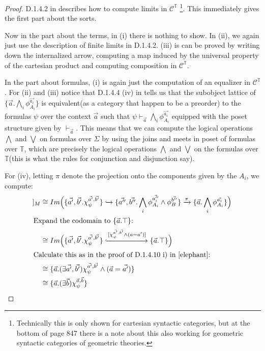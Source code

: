 \documentclass[a4paper]{amsproc}
\theoremstyle{plain}
\theoremstyle{definition}
\theoremstyle{remark}
\numberwithin{equation}{section}
\newcommand{\ldoub}{[\![ }
\newcommand{\rdoub}{]\!]}
\begin{document}
\begin{proof}
D.1.4.2 in \cite{elephant} describes how to compute limits in $\mathcal{C}^{\mathbb{T}}$ \footnote{Technically this is only shown for cartesian syntactic categories, but at the bottom of page 847 there is a note about this also working for geometric syntactic categories of geometric theories.}. This immediately gives the first part about the sorts.

Now in the part about the terms, in (i) there is nothing to show. In (ii), we again just use the description of finite limits in D.1.4.2. (iii) is can be proved by writing down the internalized arrow, computing a map induced by the universal property of the cartesian product and computing composition in $\mathcal{C}^{\mathbb{T}}$.

In the part about formulas, (i) is again just the computation of an equalizer in $\mathcal{C}^{\mathbb{T}}$. For (ii) and (iii) notice that D.1.4.4 (iv) in \cite{elephant} tells us that the subobject lattice of $\{ \vec{a} . \bigwedge_i \phi_{A_i}^{\vec{a_i}}\}$ is equivalent(as a category that happen to be a preorder) to the formulas $\psi$ over the context $\vec{a}$ such that $\psi \vdash_{\vec{a}} \bigwedge_i \phi_{A_i}^{\vec{a_i}}$ equipped with the poset structure given by $\vdash_{\vec{a}}$. This means that we can compute the logical operations $\bigwedge$ and $\bigvee$ on formulas over $\Sigma$ by using the joins and meets in poset of formulas over $\mathbb{T}$, which are precisely the logical operations $\bigwedge$ and $\bigvee$ on the formulas over $\mathbb{T}$(this is what the rules for conjunction and disjunction say).

For (iv), letting $\pi$ denote the projection onto the components given by the $A_i$, we compute:
\begin{align*}
\ldoub \vec{x} . (\exists y) \psi \rdoub_M
&\cong Im \Big (\{ \vec{a'}, \vec{b'} . \chi_{\psi}^{\vec{a'}, \vec{b'}}\} \xhookrightarrow{} \{\vec{a''}, \vec{b''} . \bigwedge_i \phi_{A_i}^{\vec{a_i''}} \wedge \phi_B^{\vec{b''}} \} \xrightarrow{\pi} \{\vec{a} . \bigwedge_i \phi_{A_i}^{\vec{a_i}}\} \Big ) \\
\shortintertext{Expand the codomain to $\{\vec{a} . \top \}$:}
&\cong Im \Big (\{ \vec{a'}, \vec{b'} . \chi_{\psi}^{\vec{a'}, \vec{b'}}\} \xhookrightarrow{[\chi_{\psi}^{\vec{a'}, \vec{b'}} \wedge (a = a')]} \{ \vec{a} . \top \} \Big ) \\
\shortintertext{Calculate this as in the proof of D.1.4.10 i) in \cite{elephant}:}
&\cong \{\vec{a} . (\exists \vec{a'}, \vec{b'}) \chi_{\psi}^{\vec{a'}, \vec{b'}} \wedge (\vec{a} = \vec{a'}) \} \\
&\cong \{\vec{a} . (\exists \vec{b}) \chi_{\psi}^{\vec{a}, \vec{b}}\}
\end{align*}

\end{proof}
\end{document}

